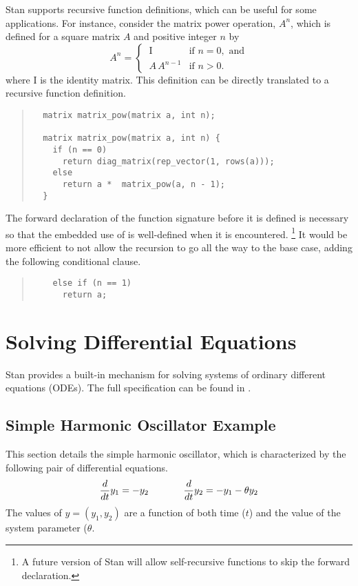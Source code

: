 Stan supports recursive function definitions, which can be useful for
some applications.  For instance, consider the matrix power operation,
$A^n$, which is defined for a square matrix $A$ and positive integer
$n$ by
\[
A^n 
=
\begin{cases}
\ \mbox{I} & \mbox{if } n = 0, \mbox{ and}
\\[3pt]
\ A \, A^{n-1} & \mbox{if } n > 0.
\end{cases}
\]
%
where $\mbox{I}$ is the identity matrix.  This definition can be
directly translated to a recursive function definition.
%
\begin{quote}
\begin{Verbatim}
  matrix matrix_pow(matrix a, int n);

  matrix matrix_pow(matrix a, int n) {
    if (n == 0)
      return diag_matrix(rep_vector(1, rows(a)));
    else 
      return a *  matrix_pow(a, n - 1);
  }
\end{Verbatim}
\end{quote}
%
The forward declaration of the function signature before it is defined
is necessary so that the embedded use of  is
well-defined when it is encountered.%
%
\footnote{A future version of Stan will allow self-recursive functions
  to skip the forward declaration.}
%
It would be more efficient to not allow the recursion to go all the
way to the base case, adding the following conditional clause.
%
\begin{quote}
\begin{Verbatim}
    else if (n == 1)
      return a;
\end{Verbatim}
\end{quote}

\chapter{Solving Differential Equations}\label{ode-solver.chapter}

\noindent
Stan provides a built-in mechanism for solving systems of ordinary
different equations (ODEs).  The full specification can be found in
.  


\section{Simple Harmonic Oscillator Example}

This section details the simple harmonic oscillator, which is
characterized by the following pair of 
differential equations.
%
\begin{equation}\label{ode-sho.equation}
\frac{d}{dt} y_1 = -y_2 
\hspace*{0.5in}
\frac{d}{dt} y_2 = -y_1 - \theta y_2
\end{equation}
%
The values of $y = (y_1,y_2)$ are a function of both time ($t$) and the
value of the system parameter ($\theta$.

